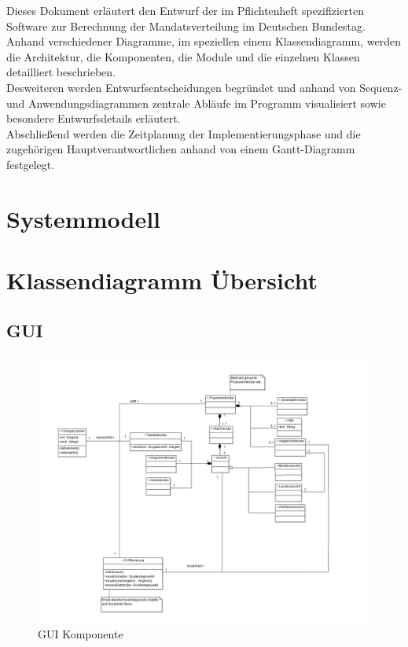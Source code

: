 \documentclass[12pt,a4paper,titlepage]{article}
\begin{document}
Dieses Dokument erläutert den Entwurf der im Pflichtenheft spezifizierten Software zur Berechnung der Mandatsverteilung im Deutschen Bundestag. \\
Anhand verschiedener Diagramme, im speziellen einem Klassendiagramm, werden die Architektur, die Komponenten, die Module und die einzelnen Klassen detailliert beschrieben.\\
Desweiteren werden Entwurfsentscheidungen begründet und anhand von Sequenz- und Anwendungsdiagrammen zentrale Abläufe im Programm visualisiert sowie besondere Entwurfsdetails erläutert.\\
Abschließend werden die Zeitplanung der Implementierungsphase und die zugehörigen Hauptverantwortlichen anhand von einem Gantt-Diagramm festgelegt.

\newpage

\section{Systemmodell}
\section{Klassendiagramm Übersicht}
\subsection{GUI}
\begin{figure}[!ht]
\includegraphics[scale=0.4]{GUI-Abschnitt.png} \caption{GUI Komponente} 
\end{figure}
\end{document}
